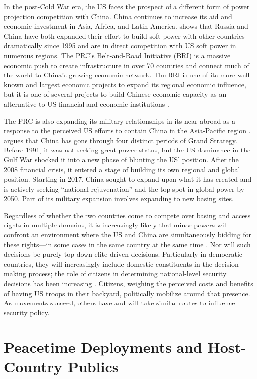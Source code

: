 In the post-Cold War era, the US faces the prospect of a different form of power projection competition with China. China continues to increase its aid and economic investment in Asia, Africa, and Latin America.  shows that Russia and China have both expanded their effort to build soft power with other countries dramatically since 1995 and are in direct competition with US soft power in numerous regions. The PRC's Belt-and-Road Initiative (BRI) is a massive economic push to create infrastructure in over 70 countries and connect much of the world to China's growing economic network.  The BRI is one of its more well-known and largest economic projects to expand its regional economic influence, but it is one of several projects to build Chinese economic capacity as an alternative to US financial and economic institutions \cite{Doshi2021}.

The PRC is also expanding its military relationships in its near-abroad as a response to the perceived US efforts to contain China in the Asia-Pacific region \cite{Yao2019}. \cite{Doshi2021} argues that China has gone through four distinct periods of Grand Strategy. Before 1991, it was not seeking great power status, but the US dominance in the Gulf War shocked it into a new phase of blunting the US' position. After the 2008 financial crisis, it entered a stage of building its own regional and global position. Starting in 2017, China sought to expand upon what it has created and is actively seeking ``national rejuvenation'' and the top spot in global power by 2050. Part of its military expansion involves expanding to new basing sites.

Regardless of whether the two countries come to compete over basing and access rights in multiple domains, it is increasingly likely that minor powers will confront an environment where the US and China are simultaneously bidding for these rights---in some cases in the same country at the same time \cite{Campbell2019}. Nor will such decisions be purely top-down elite-driven decisions. Particularly in democratic countries, they will increasingly include domestic constituents in the decision-making process; the role of citizens in determining national-level security decisions has been increasing \cite{GoldsmithHoriuchi2012}. Citizens, weighing the perceived costs and benefits of having US troops in their backyard, politically mobilize around that presence. As movements succeed, others have and will take similar routes to influence security policy. 

\section*{Peacetime Deployments and Host-Country Publics}

